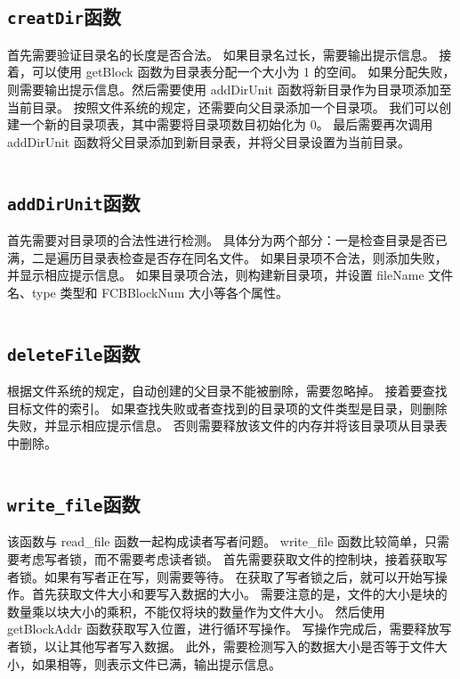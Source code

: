 \documentclass[a4paper,twoside]{article}
\begin{document}
\begin{spacing}{1.2}
\inputminted[firstline=109,lastline=119]{cpp}{../code/File.cpp}


\subsection{\texttt{creatDir}函数}

首先需要验证目录名的长度是否合法。
如果目录名过长，需要输出提示信息。
接着，可以使用 getBlock 函数为目录表分配一个大小为 1 的空间。
如果分配失败，则需要输出提示信息。然后需要使用 addDirUnit 函数将新目录作为目录项添加至当前目录。
按照文件系统的规定，还需要向父目录添加一个目录项。
我们可以创建一个新的目录项表，其中需要将目录项数目初始化为 0。
最后需要再次调用 addDirUnit 函数将父目录添加到新目录表，并将父目录设置为当前目录。

\inputminted[firstline=147,lastline=168]{cpp}{../code/File.cpp}


\subsection{\texttt{addDirUnit}函数}

首先需要对目录项的合法性进行检测。
具体分为两个部分：一是检查目录是否已满，二是遍历目录表检查是否存在同名文件。
如果目录项不合法，则添加失败，并显示相应提示信息。
如果目录项合法，则构建新目录项，并设置 fileName 文件名、type 类型和 FCBBlockNum 大小等各个属性。

\inputminted[firstline=200,lastline=224]{cpp}{../code/File.cpp}


\subsection{\texttt{deleteFile}函数}

根据文件系统的规定，自动创建的父目录不能被删除，需要忽略掉。
接着要查找目标文件的索引。
如果查找失败或者查找到的目录项的文件类型是目录，则删除失败，并显示相应提示信息。
否则需要释放该文件的内存并将该目录项从目录表中删除。

\inputminted[firstline=226,lastline=254]{cpp}{../code/File.cpp}


\subsection{\texttt{write\_file}函数}

该函数与 read\_file 函数一起构成读者写者问题。
write\_file 函数比较简单，只需要考虑写者锁，而不需要考虑读者锁。
首先需要获取文件的控制块，接着获取写者锁。如果有写者正在写，则需要等待。
在获取了写者锁之后，就可以开始写操作。首先获取文件大小和要写入数据的大小。
需要注意的是，文件的大小是块的数量乘以块大小的乘积，不能仅将块的数量作为文件大小。
然后使用 getBlockAddr 函数获取写入位置，进行循环写操作。
写操作完成后，需要释放写者锁，以让其他写者写入数据。
此外，需要检测写入的数据大小是否等于文件大小，如果相等，则表示文件已满，输出提示信息。


\end{spacing}
\end{document}
